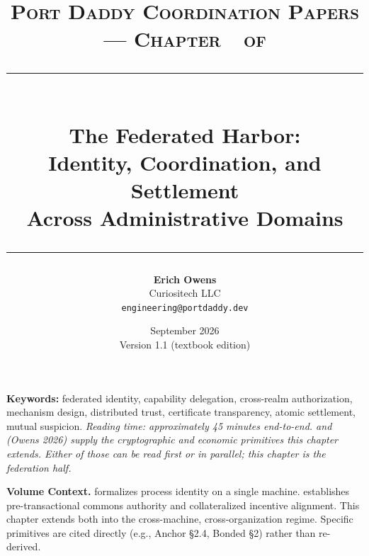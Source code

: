 \documentclass[11pt,a4paper]{article}
\title{
  \vspace{-1cm}
  {\Large\textsc{Port Daddy Coordination Papers --- Chapter~\pdchapternumber\ of \pdchaptercount}}\\[
0.5cm]
  \rule{\textwidth}{0.5pt}\\[0.3cm]
  {\LARGE\textbf{The Federated Harbor:}}\\[0.2cm]
  {\Large Identity, Coordination, and Settlement\\Across Administrative Domains}\\[0.3cm]
  \rule{\textwidth}{0.5pt}
}
\author{
  \textbf{Erich Owens}\\[0.2cm]
  Curiositech LLC\\[0.2cm]
  \texttt{engineering@portdaddy.dev}
}
\date{September 2026\\Version 1.1 (textbook edition)}
\theoremstyle{definition}
\theoremstyle{remark}
\begin{document}
\pdopensolutions
\setlength{\emergencystretch}{2em}
\maketitle
\thispagestyle{empty}
\vspace{1cm}
\vspace{0.5cm}
\noindent\textbf{Keywords:} federated identity, capability delegation, cross-realm authorization, mechanism design, distributed trust, certificate transparency, atomic settlement, mutual suspicion.
\vspace{0.4cm}
\noindent\textit{Reading time: approximately 45 minutes end-to-end.  and  (Owens 2026) supply the cryptographic and economic primitives this chapter extends. Either of those can be read first or in parallel; this chapter is the federation half.}
\vspace{0.6cm}
\begin{center}
\end{center}
\vspace{0.4cm}
\vspace{0.5cm}
\noindent\textbf{Volume Context.}  formalizes process identity on a single machine.  establishes pre-transactional commons authority and collateralized incentive alignment. This chapter extends both into the cross-machine, cross-organization regime. Specific primitives are cited directly (e.g., Anchor \S2.4, Bonded \S2) rather than re-derived.
\newpage
\tableofcontents
\newpage
\end{document}
